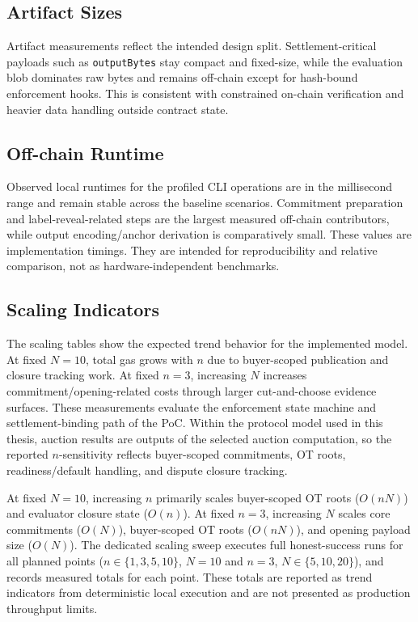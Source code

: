 \documentclass[final,twoside]{vutinfth}
\begin{document}
\subsection{Artifact Sizes}

Artifact measurements reflect the intended design split.
Settlement-critical payloads such as \texttt{outputBytes} stay compact and
fixed-size, while the evaluation blob dominates raw bytes and remains off-chain
except for hash-bound enforcement hooks.
This is consistent with constrained on-chain verification and heavier data
handling outside contract state.

\subsection{Off-chain Runtime}

Observed local runtimes for the profiled CLI operations are in the millisecond
range and remain stable across the baseline scenarios.
Commitment preparation and label-reveal-related steps are the largest measured
off-chain contributors, while output encoding/anchor derivation is
comparatively small.
These values are implementation timings.
They are intended for reproducibility and relative comparison, not as
hardware-independent benchmarks.

\subsection{Scaling Indicators}


The scaling tables show the expected trend behavior for the implemented model.
At fixed \(N=10\), total gas grows with \(n\) due to buyer-scoped publication
and closure tracking work.
At fixed \(n=3\), increasing \(N\) increases commitment/opening-related costs
through larger cut-and-choose evidence surfaces.
These measurements evaluate the enforcement state machine and settlement-binding
path of the PoC.
Within the protocol model used in this thesis, auction results are outputs of
the selected auction computation, so the reported \(n\)-sensitivity reflects
buyer-scoped commitments, OT roots, readiness/default handling, and dispute
closure tracking.

At fixed \(N=10\), increasing \(n\) primarily scales buyer-scoped OT roots
(\(O(nN)\)) and evaluator closure state (\(O(n)\)).
At fixed \(n=3\), increasing \(N\) scales core commitments (\(O(N)\)),
buyer-scoped OT roots (\(O(nN)\)), and opening payload size (\(O(N)\)).
The dedicated scaling sweep executes full honest-success runs for all planned
points (\(n \in \{1,3,5,10\}\), \(N=10\) and \(n=3\), \(N \in \{5,10,20\}\)),
and records measured totals for each point. These totals are reported as
trend indicators from deterministic local execution and are not presented as
production throughput limits.
\end{document}
